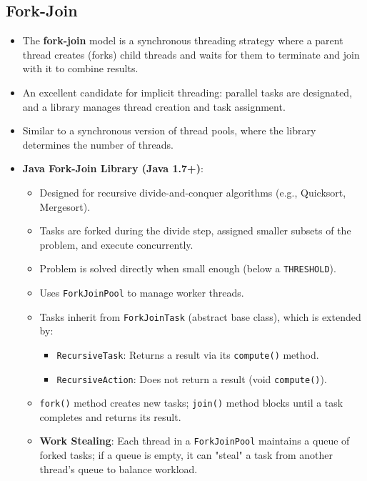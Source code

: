 \subsection{Fork-Join}
\begin{itemize}
    \item The \textbf{fork-join} model is a synchronous threading strategy where a parent thread creates (forks) child threads and waits for them to terminate and join with it to combine results.
    \item An excellent candidate for implicit threading: parallel tasks are designated, and a library manages thread creation and task assignment.
    \item Similar to a synchronous version of thread pools, where the library determines the number of threads.
    \item \textbf{Java Fork-Join Library (Java 1.7+)}:
        \begin{itemize}
            \item Designed for recursive divide-and-conquer algorithms (e.g., Quicksort, Mergesort).
            \item Tasks are forked during the divide step, assigned smaller subsets of the problem, and execute concurrently.
            \item Problem is solved directly when small enough (below a \texttt{THRESHOLD}).
            \item Uses \texttt{ForkJoinPool} to manage worker threads.
            \item Tasks inherit from \texttt{ForkJoinTask} (abstract base class), which is extended by:
                \begin{itemize}
                    \item \texttt{RecursiveTask}: Returns a result via its \texttt{compute()} method.
                    \item \texttt{RecursiveAction}: Does not return a result (void \texttt{compute()}).
                \end{itemize}
            \item \texttt{fork()} method creates new tasks; \texttt{join()} method blocks until a task completes and returns its result.
            \item \textbf{Work Stealing}: Each thread in a \texttt{ForkJoinPool} maintains a queue of forked tasks; if a queue is empty, it can "steal" a task from another thread's queue to balance workload.
        \end{itemize}
\end{itemize}

